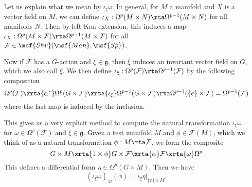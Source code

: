 \begin{remark}\label{remark:iota}
  Let us explain what we mean by $\iota_\xi \omega$. In general, for $M$ a manifold and $X$ is a vector field on $M$, we can define $\iota_X: \Omega^p(M \times N) \rta \Omega^{p - 1}(M \times N)$ for all manifolds $N$. Then by left Kan extension, this induces a map $\iota_X: \Omega^p(M \times \mathcal{F}) \rta \Omega^{p - 1}(M \times \mathcal{F})$ for all $\mathcal{F} \in \msf{Shv}(\msf{Man}, \msf{Sp})$. 

  Now if $\mathcal{F}$ has a $G$-action and $\xi \in \mathfrak{g}$, then $\xi$ induces an invariant vector field on $G$, which we also call $\xi$. We then define $\iota_\xi: \Omega^p(\mathcal{F}) \rta \Omega^{p - 1}(\mathcal{F})$ by the following composition
    \[ \Omega^p(\mathcal{F}) \xrta{\alpha^*} \Omega^p(G \times \mathcal{F})\xrta{\iota_\xi} \Omega^{p - 1}(G \times \mathcal{F})\rta \Omega^{p - 1}(\{e\} \times \mathcal{F}) = \Omega^{p - 1}(\mathcal{F}) \]
  where the last map is induced by the inclusion.

  This gives us a very explicit method to compute the natural transformation $\iota_\xi \omega$ for $\omega \in \Omega^p(\mathcal{F})$ and $\xi \in \mathfrak{g}$. Given a test manifold $M$ and $\phi \in \mathcal{F}(M)$, which we think of as a natural transformation $\phi: M \rta \mathcal{F}$, we form the composite
\[
        G \times M \xrta{1 \times \phi}  G \times \mathcal{F}\xrta{\alpha} \mathcal{F} \xrta{\omega}\Omega^p
    \]
  This defines a differential form $\eta \in \Omega^p(G \times M)$. Then we have
  \[
    (\iota_\xi \omega)_M(\phi) = \iota_{\xi} \eta|_{\{e\} \times M}.
  \]
\end{remark}

